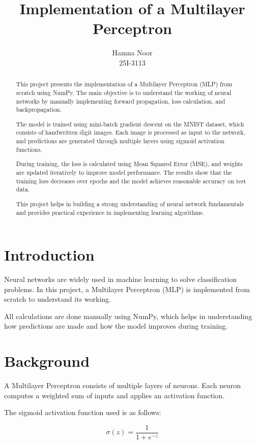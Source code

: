 \documentclass[runningheads]{llncs}
\title{Implementation of a Multilayer Perceptron}
\author{Hamna Noor \\ 25I-3113}
\institute{FAST NUCES, Islamabad}
\begin{document}
\maketitle

\begin{abstract}
This project presents the implementation of a Multilayer Perceptron (MLP) from scratch using NumPy. The main objective is to understand the working of neural networks by manually implementing forward propagation, loss calculation, and backpropagation.

The model is trained using mini-batch gradient descent on the MNIST dataset, which consists of handwritten digit images. Each image is processed as input to the network, and predictions are generated through multiple layers using sigmoid activation functions.

During training, the loss is calculated using Mean Squared Error (MSE), and weights are updated iteratively to improve model performance. The results show that the training loss decreases over epochs and the model achieves reasonable accuracy on test data.

This project helps in building a strong understanding of neural network fundamentals and provides practical experience in implementing learning algorithms.
\end{abstract}

\section{Introduction}
Neural networks are widely used in machine learning to solve classification problems. In this project, a Multilayer Perceptron (MLP) is implemented from scratch to understand its working.

All calculations are done manually using NumPy, which helps in understanding how predictions are made and how the model improves during training.

\section{Background}
A Multilayer Perceptron consists of multiple layers of neurons. Each neuron computes a weighted sum of inputs and applies an activation function.

The sigmoid activation function used is as follows:

\[
\sigma(z) = \frac{1}{1 + e^{-z}}
\]
\end{document}
